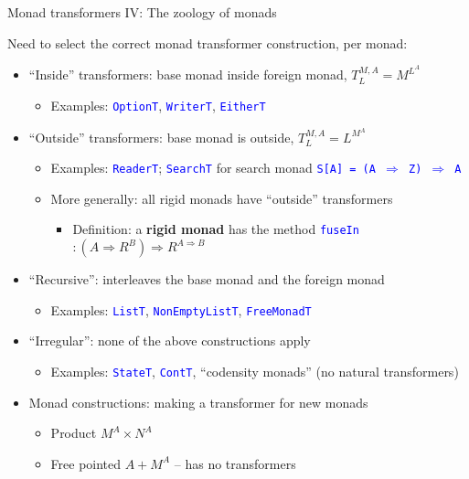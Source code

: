 \documentclass[english]{beamer}
\begin{document}
\begin{frame}{Monad transformers IV: The zoology of monads}

Need to select the correct monad transformer construction, per monad:
\begin{itemize}
\item ``Inside'' transformers: base monad inside foreign monad, $T_{L}^{M,A}=M^{L^{A}}$
\begin{itemize}
\item Examples: \texttt{\textcolor{blue}{\footnotesize{}OptionT}}, \texttt{\textcolor{blue}{\footnotesize{}WriterT}},
\texttt{\textcolor{blue}{\footnotesize{}EitherT}} 
\end{itemize}
\item ``Outside'' transformers: base monad is outside, $T_{L}^{M,A}=L^{M^{A}}$
\begin{itemize}
\item Examples: \texttt{\textcolor{blue}{\footnotesize{}ReaderT}}; \texttt{\textcolor{blue}{\footnotesize{}SearchT}}
for search monad \texttt{\textcolor{blue}{\footnotesize{}S{[}A{]}
= (A $\Rightarrow$ Z) $\Rightarrow$ A}} 
\item More generally: all rigid monads have ``outside'' transformers
\begin{itemize}
\item Definition: a \textbf{rigid monad} has the method \texttt{\textcolor{blue}{\footnotesize{}fuseIn}}$:\left(A\Rightarrow R^{B}\right)\Rightarrow R^{A\Rightarrow B}$
\end{itemize}
\end{itemize}
\item ``Recursive'': interleaves the base monad and the foreign monad
\begin{itemize}
\item Examples: \texttt{\textcolor{blue}{\footnotesize{}ListT}}, \texttt{\textcolor{blue}{\footnotesize{}NonEmptyListT}},
\texttt{\textcolor{blue}{\footnotesize{}FreeMonadT}} 
\end{itemize}
\item ``Irregular'': none of the above constructions apply
\begin{itemize}
\item Examples: \texttt{\textcolor{blue}{\footnotesize{}StateT}}, \texttt{\textcolor{blue}{\footnotesize{}ContT}},
``codensity monads'' (no natural transformers)
\end{itemize}
\item Monad constructions: making a transformer for new monads
\begin{itemize}
\item Product $M^{A}\times N^{A}$
\item Free pointed $A+M^{A}$ -- has no transformers
\end{itemize}
\end{itemize}
\end{frame}
\end{document}
